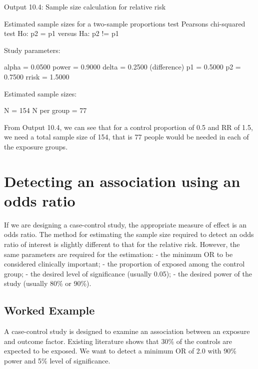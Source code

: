 \documentclass[
]{memoir}
\newenvironment{Shaded}{\begin{snugshade}}{\end{snugshade}}
\newcommand{\NormalTok}[1]{#1}
\begin{document}
Output 10.4: Sample size calculation for relative risk

\begin{Shaded}
\begin{Highlighting}[]
\NormalTok{Estimated sample sizes for a two{-}sample proportions test}
\NormalTok{Pearson\textquotesingle{}s chi{-}squared test }
\NormalTok{Ho: p2 = p1  versus  Ha: p2 != p1}

\NormalTok{Study parameters:}

\NormalTok{        alpha =    0.0500}
\NormalTok{        power =    0.9000}
\NormalTok{        delta =    0.2500  (difference)}
\NormalTok{           p1 =    0.5000}
\NormalTok{           p2 =    0.7500}
\NormalTok{        rrisk =    1.5000}

\NormalTok{Estimated sample sizes:}

\NormalTok{            N =       154}
\NormalTok{  N per group =        77}
\end{Highlighting}
\end{Shaded}

From Output 10.4, we can see that for a control proportion of 0.5 and RR of 1.5, we need a total sample size of 154, that is 77 people would be needed in each of the exposure groups.

\hypertarget{detecting-an-association-using-an-odds-ratio}{%
\section{Detecting an association using an odds ratio}\label{detecting-an-association-using-an-odds-ratio}}

If we are designing a case-control study, the appropriate measure of effect is an odds ratio. The method for estimating the sample size required to detect an odds ratio of interest is slightly different to that for the relative risk. However, the same parameters are required for the estimation:
- the minimum OR to be considered clinically important;
- the proportion of exposed among the control group;
- the desired level of significance (usually 0.05);
- the desired power of the study (usually 80\% or 90\%).

\hypertarget{worked-example-18}{%
\subsection{Worked Example}\label{worked-example-18}}

A case-control study is designed to examine an association between an exposure and outcome factor. Existing literature shows that 30\% of the controls are expected to be exposed. We want to detect a minimum OR of 2.0 with 90\% power and 5\% level of significance.
\end{document}
